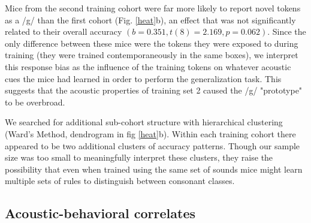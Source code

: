 Mice from the second training cohort were far more likely to report novel tokens as a /g/ than the first cohort (Fig. \ref{heat}b), an effect that was not significantly related to their overall accuracy $(b=0.351, t(8)=2.169, p=0.062 )$. Since the only difference between these mice were the tokens they were exposed to during training (they were trained contemporaneously in the same boxes),  we interpret this response bias as the influence of the training tokens on whatever acoustic cues the mice had learned in order to perform the generalization task. This suggests that the acoustic properties of training set 2 caused the /g/ "prototype" to be overbroad.

We searched for additional sub-cohort structure with hierarchical clustering (Ward's Method, dendrogram in fig \ref{heat}b). Within each training cohort there appeared to be two additional clusters of accuracy patterns. Though our sample size was too small to meaningfully interpret these clusters, they raise the possibility that even when trained using the same set of sounds mice might learn multiple sets of rules to distinguish between consonant classes.

%
%
%
\subsection{Acoustic-behavioral correlates}


